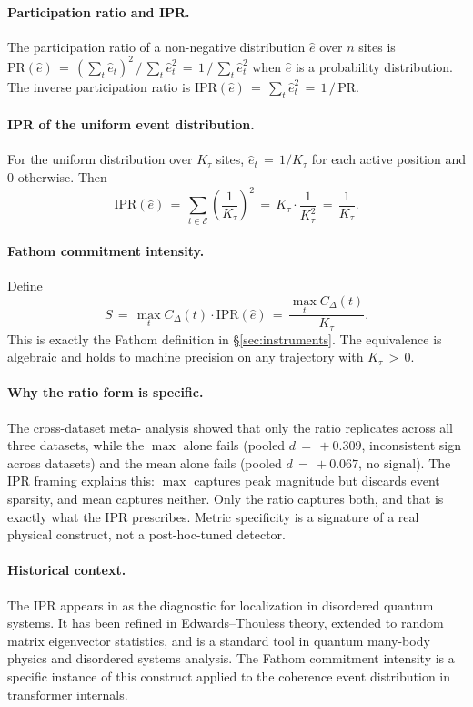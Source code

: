 \documentclass[11pt,letterpaper]{article}
\begin{document}
\paragraph{Participation ratio and IPR.} The participation ratio of a
non-negative distribution $\hat{e}$ over $n$ sites is $\text{PR}(\hat{e})
\,=\,(\sum_t \hat{e}_t)^2\,/\,\sum_t \hat{e}_t^2\,=\,1\,/\,\sum_t
\hat{e}_t^2$ when $\hat{e}$ is a probability distribution. The inverse
participation ratio is $\text{IPR}(\hat{e})\,=\,\sum_t \hat{e}_t^2\,=\,
1\,/\,\text{PR}$.

\paragraph{IPR of the uniform event distribution.} For the uniform
distribution over $K_\tau$ sites, $\hat{e}_t\,=\,1/K_\tau$ for each active
position and $0$ otherwise. Then
\[
\text{IPR}(\hat{e})\,=\,\sum_{t\in\mathcal{E}}\left(\frac{1}{K_\tau}\right)^{\!2}
\,=\,K_\tau\cdot\frac{1}{K_\tau^2}\,=\,\frac{1}{K_\tau}.
\]

\paragraph{Fathom commitment intensity.} Define
\[
S\,=\,\max_t C_\Delta(t)\cdot\text{IPR}(\hat{e})\,=\,\frac{\max_t C_\Delta(t)}{K_\tau}.
\]
This is exactly the Fathom definition in \S\ref{sec:instruments}. The
equivalence is algebraic and holds to machine precision on any trajectory
with $K_\tau\,>\,0$.

\paragraph{Why the ratio form is specific.} The cross-dataset meta-
analysis showed that only the ratio replicates across all three datasets,
while the $\max$ alone fails (pooled $d\,=\,+0.309$, inconsistent sign
across datasets) and the mean alone fails (pooled $d\,=\,+0.067$, no
signal). The IPR framing explains this: $\max$ captures peak magnitude
but discards event sparsity, and mean captures neither. Only the ratio
captures both, and that is exactly what the IPR prescribes. Metric
specificity is a signature of a real physical construct, not a
post-hoc-tuned detector.

\paragraph{Historical context.} The IPR appears in \citet{anderson1958absence}
as the diagnostic for localization in disordered quantum systems. It has
been refined in Edwards--Thouless theory, extended to random matrix
eigenvector statistics, and is a standard tool in quantum many-body
physics and disordered systems analysis. The Fathom commitment intensity
is a specific instance of this construct applied to the coherence event
distribution in transformer internals.
\end{document}
